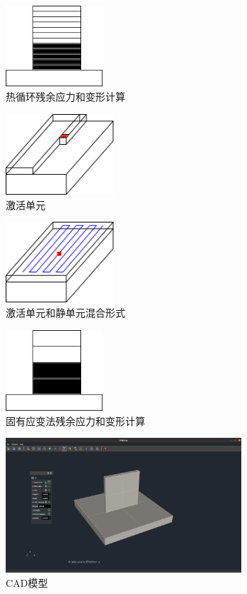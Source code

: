 \begin{figure}[!htbp]
  \centering
  \includegraphics[height=3cm]{fig/4/1.png}
  \caption{热循环残余应力和变形计算}
  \label{fig:4-1}
\end{figure}

\begin{figure}[!htbp]
  \centering
  \includegraphics[height=3cm]{fig/4/2.png}
  \caption{激活单元}
  \label{fig:4-2}
\end{figure}

\begin{figure}[!htbp]
  \centering
  \includegraphics[height=3cm]{fig/4/3.png}
  \caption{激活单元和静单元混合形式}
  \label{fig:4-3}
\end{figure}

\begin{figure}[!htbp]
  \centering
  \includegraphics[height=3cm]{fig/4/4.png}
  \caption{固有应变法残余应力和变形计算}
  \label{fig:4-4}
\end{figure}

\begin{figure}[!htbp]
  \centering
  \includegraphics[height=5cm]{fig/4/5.png}
  \caption{CAD模型}
  \label{fig:4-5}
\end{figure}

